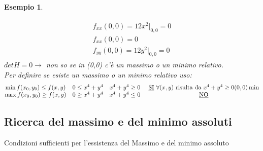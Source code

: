 \documentclass{book}
\newtheorem{esempio}{Esempio}
\begin{document}
\begin{esempio}
\begin{enumerate}
\begin{equation*}
\begin{matrix}
\begin{matrix}
					f_{xx}(0,0)=12x^2|_{0,0}=0\\
					f_{xx}(0,0)= 0\\
					f_{yy}(0,0)=12y^2|_{0,0}=0
				  \end{matrix}
			  \end{matrix}
		  \end{equation*}
		  $det H=0 \to$ non so se in (0,0) c'è un massimo o un minimo
		  relativo.\\
		  Per definire se esiste un massimo o un minimo relativo uso:
		  \begin{equation*}
			  \begin{matrix}
				  \min f(x_0,y_0)\leq f(x,y) & 0\leq x^4+y^4 & x^4+y^4\geq 0 &
				  \text{ \underline{SI} $\forall(x,y)$ risulta da
				  $x^4+y^4\geq 0 (0,0)\min$}\\
				  \max f(x_0,y_0)\geq f(x,y) & 0\geq x^4+y^4 & x^4+y^4\leq 0 &
				  \text{ \underline{NO}}
			  \end{matrix}
		  \end{equation*}
  \end{enumerate}
\end{esempio}
\subsection{Ricerca del massimo e del minimo assoluti}
Condizioni sufficienti per l'essistenza del Massimo e del minimo assoluto
\end{document}
